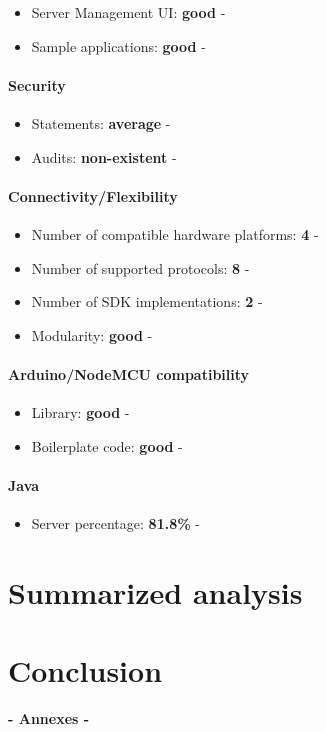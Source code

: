 \documentclass{article}
\begin{document}
\begin{itemize}
\item Server Management UI: \textbf{good} - 
\item Sample applications: \textbf{good} - 
\end{itemize}

\paragraph{Security} 

\begin{itemize}
\item Statements: \textbf{average} - 
\item Audits: \textbf{non-existent} - 
\end{itemize}

\paragraph{Connectivity/Flexibility}

\begin{itemize}
\item Number of compatible hardware platforms: \textbf{4} - 
\item Number of supported protocols: \textbf{8} - 
\item Number of SDK implementations: \textbf{2} - 
\item Modularity: \textbf{good} - 
\end{itemize}

\paragraph{Arduino/NodeMCU compatibility}

\begin{itemize}
\item Library: \textbf{good} - 
\item Boilerplate code: \textbf{good} - 
\end{itemize}

\paragraph{Java} 

\begin{itemize}
\item Server percentage: \textbf{81.8\%} - 
\end{itemize}

\section{Summarized analysis}

\section{Conclusion}

\pagebreak
\begin{titlepage}
    \vspace*{\fill}
        \begin{center}
          \textbf{\huge - Annexes -}\\[20pt]
        \end{center}
    \vspace*{\fill}
\end{titlepage}
\end{document}
